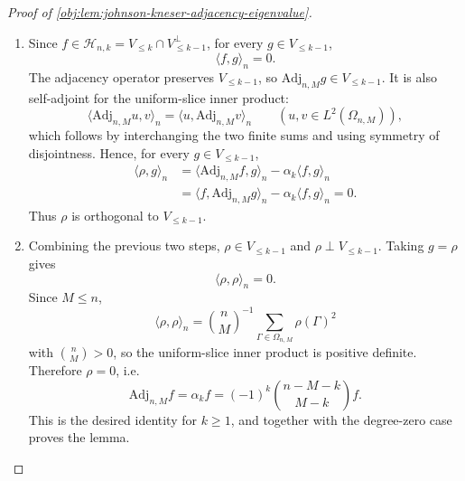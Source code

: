 \begin{proof}[Proof of \cref{obj:lem:johnson-kneser-adjacency-eigenvalue}]
\begin{enumerate}
\item Since \(f\in\mathcal H_{n,k}=V_{\le k}\cap V_{\le k-1}^{\perp}\), for every \(g\in V_{\le k-1}\),
\[
\langle f,g\rangle_n=0.
\]
The adjacency operator preserves \(V_{\le k-1}\), so \(\mathrm{Adj}_{n,M}g\in V_{\le k-1}\). It is also self-adjoint for the uniform-slice inner product:
\[
\langle \mathrm{Adj}_{n,M}u,v\rangle_n
=
\langle u,\mathrm{Adj}_{n,M}v\rangle_n
\qquad
(u,v\in L^2(\Omega_{n,M})),
\]
which follows by interchanging the two finite sums and using symmetry of disjointness. Hence, for every \(g\in V_{\le k-1}\),
\[
\begin{aligned}
\langle \rho,g\rangle_n
&=
\langle \mathrm{Adj}_{n,M}f,g\rangle_n-\alpha_k\langle f,g\rangle_n  \\
&=
\langle f,\mathrm{Adj}_{n,M}g\rangle_n-\alpha_k\langle f,g\rangle_n
=
0.
\end{aligned}
\]
Thus \(\rho\) is orthogonal to \(V_{\le k-1}\). %

\item Combining the previous two steps, \(\rho\in V_{\le k-1}\) and \(\rho\perp V_{\le k-1}\). Taking \(g=\rho\) gives
\[
\langle \rho,\rho\rangle_n=0.
\]
Since \(M\le n\),
\[
\langle \rho,\rho\rangle_n
=
\binom nM^{-1}\sum_{\Gamma\in\Omega_{n,M}}\rho(\Gamma)^2
\]
with \(\binom nM>0\), so the uniform-slice inner product is positive definite. Therefore \(\rho=0\), i.e.
\[
\mathrm{Adj}_{n,M}f=\alpha_k f
=
(-1)^k\binom{n-M-k}{M-k}f.
\]
This is the desired identity for \(k\ge 1\), and together with the degree-zero case proves the lemma. %
\end{enumerate}
\end{proof}
